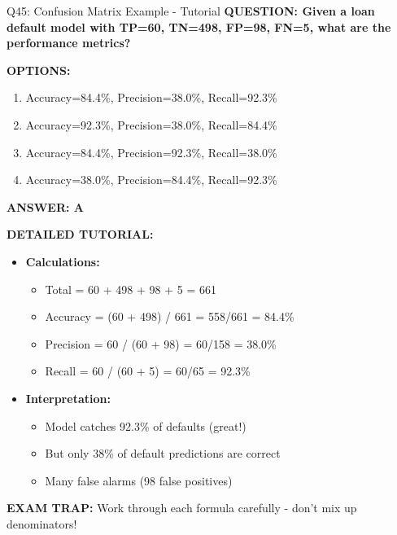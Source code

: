 \documentclass[8pt]{beamer}
\begin{document}
	\begin{frame}{Q45: Confusion Matrix Example - Tutorial}
		\fontsize{6.5}{7.5}\selectfont
		\textbf{QUESTION: Given a loan default model with TP=60, TN=498, FP=98, FN=5, what are the performance metrics?}
		
		\vspace{0.1cm}
		\textbf{OPTIONS:}
		\begin{enumerate}
			\item Accuracy=84.4\%, Precision=38.0\%, Recall=92.3\%
			\item Accuracy=92.3\%, Precision=38.0\%, Recall=84.4\%
			\item Accuracy=84.4\%, Precision=92.3\%, Recall=38.0\%
			\item Accuracy=38.0\%, Precision=84.4\%, Recall=92.3\%
		\end{enumerate}
		
		\vspace{0.1cm}
		\textcolor{myblue}{\textbf{ANSWER: A}}
		
		\vspace{0.1cm}
		\textbf{DETAILED TUTORIAL:}
		\begin{itemize}
			\item \textbf{Calculations:}
			\begin{itemize}
				\item Total = 60 + 498 + 98 + 5 = 661
				\item Accuracy = (60 + 498) / 661 = 558/661 = 84.4\%
				\item Precision = 60 / (60 + 98) = 60/158 = 38.0\%
				\item Recall = 60 / (60 + 5) = 60/65 = 92.3\%
			\end{itemize}
			\item \textbf{Interpretation:}
			\begin{itemize}
				\item Model catches 92.3\% of defaults (great!)
				\item But only 38\% of default predictions are correct
				\item Many false alarms (98 false positives)
			\end{itemize}
		\end{itemize}
		
		\textcolor{myred}{\textbf{EXAM TRAP:}} Work through each formula carefully - don't mix up denominators!
	\end{frame}
	
	
\end{document}
